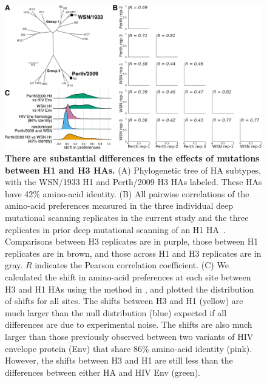 \documentclass[9pt,twocolumn,twoside]{pnas-new}
\begin{document}
\begin{figure}
\centering
\includegraphics[width=12cm]{figs/distance_distribution/distance_distribution.pdf}
\caption{\label{fig:distance_distribution}
{\bf There are substantial differences in the effects of mutations between H1 and H3 HAs.}
(A) Phylogenetic tree of HA subtypes, with the WSN/1933 H1 and Perth/2009 H3 HAs labeled. 
These HAs have 42\% amino-acid identity.
(B) All pairwise correlations of the amino-acid preferences measured in the three individual deep mutational scanning replicates in the current study  and the three replicates in prior deep mutational scanning of an H1 HA~\cite{doud2016accurate}.
Comparisons between H3 replicates are in purple, those between H1 replicates are in brown, and those across H1 and H3 replicates are in gray. 
$R$ indicates the Pearson correlation coefficient.
(C) We calculated the shift in amino-acid preferences at each site between H3 and H1 HAs using the method in \cite{haddox2017mapping}, and plotted the distribution of shifts for all sites.
The shifts between H3 and H1 (yellow) are much larger than the null distribution (blue) expected if all differences are due to experimental noise.
The shifts are also much larger than those previously observed between two variants of HIV envelope protein (Env) that share 86\% amino-acid identity (pink).
However, the shifts between H3 and H1 are still less than the differences between either HA and HIV Env (green).
}
\end{figure}
\end{document}
